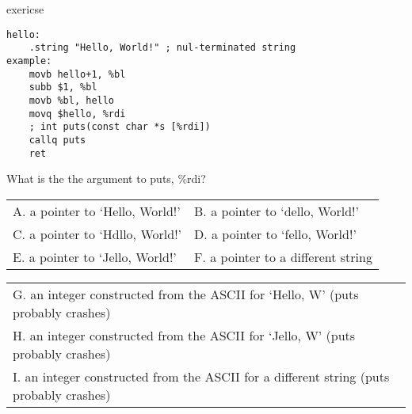 \begin{frame}[fragile,label=attExercise]{exericse}
\begin{lstlisting}[language=myasm,style=smaller]
hello:
    .string "Hello, World!" ; nul-terminated string
example:
    movb hello+1, %bl
    subb $1, %bl
    movb %bl, hello
    movq $hello, %rdi
    ; int puts(const char *s [%rdi])
    callq puts
    ret
\end{lstlisting}
What is the the argument to puts, \%rdi?

\small
\begin{tabular}{ll}
A. a pointer to `Hello, World!' & B. a pointer to `dello, World!' \\
C. a pointer to `Hdllo, World!' & D. a pointer to `fello, World!' \\
E. a pointer to `Jello, World!' & F. a pointer to a different string \\
\end{tabular}
\begin{tabular}{l}
G. an integer constructed from the ASCII for `Hello, W' (puts probably crashes) \\
H. an integer constructed from the ASCII for `Jello, W' (puts probably crashes) \\
I. an integer constructed from the ASCII for a different string (puts probably crashes) \\
\end{tabular}
\end{frame}
